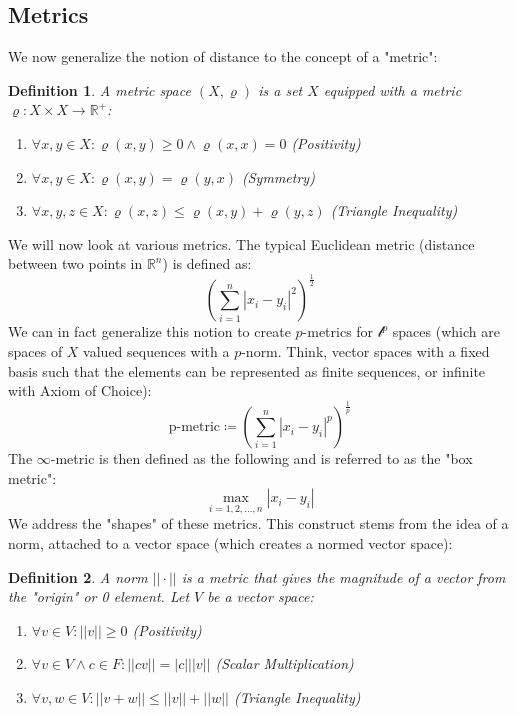\documentclass{article}
\newtheorem{defn}{Definition}[section]
\begin{document}
\subsection{Metrics}
We now generalize the notion of distance to the concept of a "metric":
\begin{defn}
A metric space $(X, \varrho)$ is a set $X$ equipped with a metric $\varrho: X \times X \xrightarrow{} \mathbb{R}^+$:
\begin{enumerate}
    \item $\forall x, y \in X: \varrho(x, y) \geqslant 0 \land \varrho(x, x) = 0$ (Positivity)
    \item $\forall x, y \in X: \varrho(x, y) = \varrho(y, x)$ (Symmetry)
    \item $\forall x, y, z \in X: \varrho(x, z) \leqslant \varrho(x, y) + \varrho(y, z)$ (Triangle Inequality)
\end{enumerate}
\end{defn}
We will now look at various metrics. The typical Euclidean metric (distance between two points in $\mathbb{R}^n$) is defined as:
\begin{equation*}
    (\sum_{i=1}^{n}|x_i - y_i|^2)^{\frac{1}{2}}
\end{equation*}
We can in fact generalize this notion to create $p$-metrics for $\mathcal{l}^p$ spaces (which are spaces of $X$ valued sequences with a $p$-norm. Think, vector spaces with a fixed basis such that the elements can be represented as finite sequences, or infinite with Axiom of Choice):
\begin{equation*}
    \text{p-metric} \coloneq (\sum_{i=1}^{n}|x_i - y_i|^p)^{\frac{1}{p}}
\end{equation*}
The $\infty$-metric is then defined as the following and is referred to as the "box metric":
\begin{equation*}
    \max_{i = 1, 2, ..., n}|x_i - y_i|
\end{equation*}
We address the "shapes" of these metrics. This construct stems from the idea of a norm, attached to a vector space (which creates a normed vector space):
\begin{defn}
A norm $||\cdot||$ is a metric that gives the magnitude of a vector from the "origin" or 0 element. Let $V$ be a vector space:
\begin{enumerate}
    \item $\forall v \in V: ||v|| \geqslant 0$ (Positivity)
    \item $\forall v \in V \land c \in F: ||cv|| = |c|||v||$ (Scalar Multiplication)
    \item $\forall v, w \in V: ||v + w|| \leqslant ||v|| + ||w||$ (Triangle Inequality)
\end{enumerate}
\end{defn}
\end{document}
